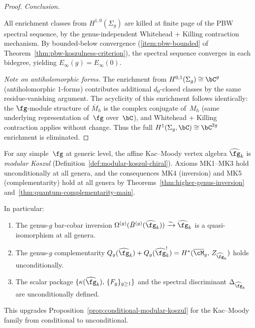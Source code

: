 \begin{proof}
\medskip
\emph{Conclusion.}

All enrichment classes from $H^{1,0}(\Sigma_g)$ are
killed at finite page of the PBW spectral sequence,
by the genus-independent Whitehead + Killing contraction
mechanism.  By bounded-below convergence
(\ref{item:pbw-bounded} of
Theorem~\ref{thm:pbw-koszulness-criterion}), the spectral
sequence converges in each bidegree, yielding
$E_\infty(g) = E_\infty(0)$.

\smallskip
\emph{Note on antiholomorphic forms.}
The enrichment from $H^{0,1}(\Sigma_g) \cong \bC^g$
(antiholomorphic $1$-forms) contributes additional
$d_0$-closed classes by the same residue-vanishing
argument.  The acyclicity of this enrichment follows
identically: the $\fg$-module structure of
$\overline{M}_h$ is the complex conjugate of~$M_h$
(same underlying representation of~$\fg$ over~$\bC$),
and Whitehead + Killing contraction applies without
change.  Thus the full $H^1(\Sigma_g, \bC) \cong
\bC^{2g}$ enrichment is eliminated.
\end{proof}

\begin{corollary}
\label{cor:unconditional-allgenera-km}
For any simple~$\fg$ at generic level, the affine
Kac--Moody vertex algebra $\widehat{\fg}_k$ is
\emph{modular Koszul}
\textup{(}Definition~\textup{\ref{def:modular-koszul-chiral})}.
Axioms \textup{MK1--MK3} hold unconditionally at all genera,
and the consequences \textup{MK4} \textup{(}inversion\textup{)}
and \textup{MK5} \textup{(}complementarity\textup{)} hold
at all genera by
Theorems~\textup{\ref{thm:higher-genus-inversion}}
and~\textup{\ref{thm:quantum-complementarity-main}}.

In particular:
\begin{enumerate}[label=\textup{(\roman*)}]
\item The genus-$g$ bar-cobar inversion
$\Omega^{(g)}(\bar{B}^{(g)}(\widehat{\fg}_k))
\xrightarrow{\sim} \widehat{\fg}_k$ is a
quasi-isomorphism at all genera.
\item The genus-$g$ complementarity
$Q_g(\widehat{\fg}_k) + Q_g(\widehat{\fg}_k^!)
= H^*(\overline{\cM}_g,\, Z_{\widehat{\fg}_k})$
holds unconditionally.
\item The scalar package
$\{\kappa(\widehat{\fg}_k),\, \{F_g\}_{g \geq 1}\}$ and the
spectral discriminant $\Delta_{\widehat{\fg}_k}$ are
unconditionally defined.
\end{enumerate}
This upgrades
Proposition~\textup{\ref{prop:conditional-modular-koszul}}
for the Kac--Moody family from conditional to
unconditional.
\end{corollary}

